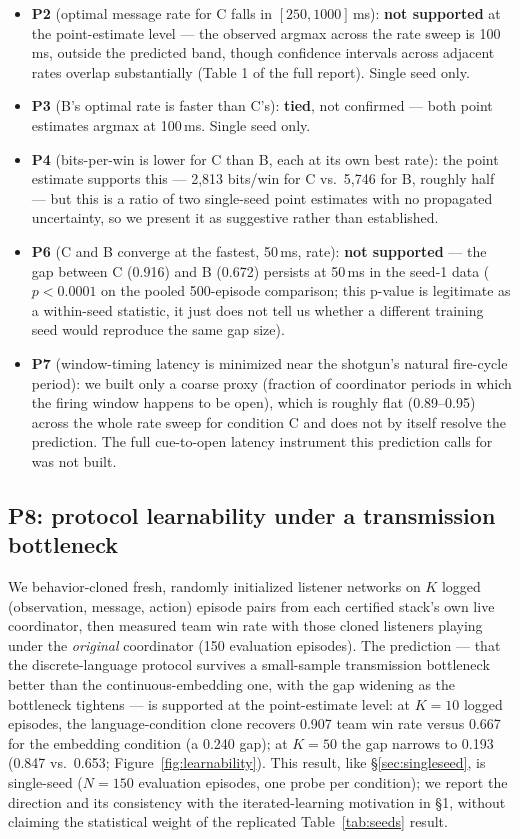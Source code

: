 \documentclass[11pt]{article}
\begin{document}
\begin{itemize}
\item \textbf{P2} (optimal message rate for C falls in $[250,
  1000]$\,ms): \textbf{not supported} at the point-estimate level ---
  the observed argmax across the rate sweep is 100\,ms, outside the
  predicted band, though confidence intervals across adjacent rates
  overlap substantially (Table 1 of the full report). Single seed only.
\item \textbf{P3} (B's optimal rate is faster than C's): \textbf{tied},
  not confirmed --- both point estimates argmax at 100\,ms. Single seed
  only.
\item \textbf{P4} (bits-per-win is lower for C than B, each at its own
  best rate): the point estimate supports this --- 2{,}813 bits/win for
  C vs.\ 5{,}746 for B, roughly half --- but this is a ratio of two
  single-seed point estimates with no propagated uncertainty, so we
  present it as suggestive rather than established.
\item \textbf{P6} (C and B converge at the fastest, 50\,ms, rate):
  \textbf{not supported} --- the gap between C (0.916) and B (0.672)
  persists at 50\,ms in the seed-1 data ($p < 0.0001$ on the pooled
  500-episode comparison; this p-value is legitimate as a within-seed
  statistic, it just does not tell us whether a different training seed
  would reproduce the same gap size).
\item \textbf{P7} (window-timing latency is minimized near the
  shotgun's natural fire-cycle period): we built only a coarse proxy
  (fraction of coordinator periods in which the firing window happens
  to be open), which is roughly flat (0.89--0.95) across the whole rate
  sweep for condition C and does not by itself resolve the prediction.
  The full cue-to-open latency instrument this prediction calls for was
  not built.
\end{itemize}

\subsection{P8: protocol learnability under a transmission bottleneck}
\label{sec:p8}

We behavior-cloned fresh, randomly initialized listener networks on $K$
logged (observation, message, action) episode pairs from each certified
stack's own live coordinator, then measured team win rate with those
cloned listeners playing under the \emph{original} coordinator (150
evaluation episodes). The prediction --- that the discrete-language
protocol survives a small-sample transmission bottleneck better than
the continuous-embedding one, with the gap widening as the bottleneck
tightens --- is supported at the point-estimate level: at $K=10$ logged
episodes, the language-condition clone recovers 0.907 team win rate
versus 0.667 for the embedding condition (a 0.240 gap); at $K=50$ the
gap narrows to 0.193 (0.847 vs.\ 0.653; Figure~\ref{fig:learnability}).
This result, like
\S\ref{sec:singleseed}, is single-seed ($N=150$ evaluation episodes,
one probe per condition); we report the direction and its consistency
with the iterated-learning motivation in \S1, without claiming the
statistical weight of the replicated Table~\ref{tab:seeds} result.
\end{document}

